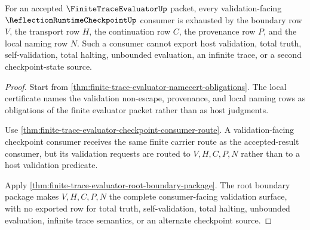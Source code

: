 \begin{theorem}
\label{thm:finite-trace-evaluator-validation-boundary-consumer-totality}
For an accepted $\FiniteTraceEvaluatorUp$ packet, every validation-facing
$\ReflectionRuntimeCheckpointUp$ consumer is exhausted by the boundary row
$V$, the transport row $H$, the continuation row $C$, the provenance row $P$,
and the local naming row $N$. Such a consumer cannot export host validation,
total truth, self-validation, total halting, unbounded evaluation, an infinite
trace, or a second checkpoint-state source.
\end{theorem}
\begin{proof}
Start from \autoref{thm:finite-trace-evaluator-namecert-obligations}. The
local certificate names the validation non-escape, provenance, and local
naming rows as obligations of the finite evaluator packet rather than as host
judgments.

Use \autoref{thm:finite-trace-evaluator-checkpoint-consumer-route}. A
validation-facing checkpoint consumer receives the same finite carrier route
as the accepted-result consumer, but its validation requests are routed to
$V,H,C,P,N$ rather than to a host validation predicate.

Apply \autoref{thm:finite-trace-evaluator-root-boundary-package}. The root
boundary package makes $V,H,C,P,N$ the complete consumer-facing validation
surface, with no exported row for total truth, self-validation, total halting,
unbounded evaluation, infinite trace semantics, or an alternate checkpoint
source.
\end{proof}

